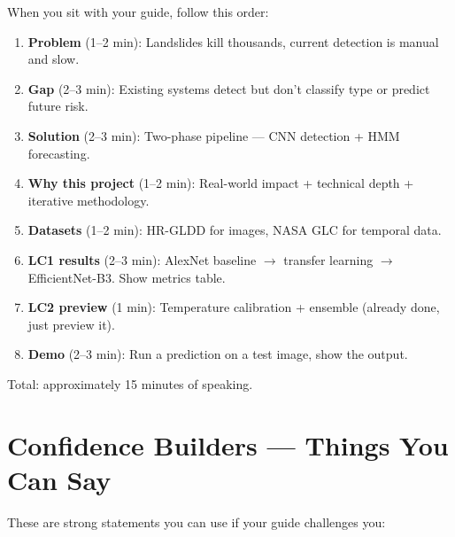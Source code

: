 \documentclass[11pt]{article}
\begin{document}
When you sit with your guide, follow this order:

\begin{enumerate}
    \item \textbf{Problem} (1--2 min): Landslides kill thousands, current detection is manual and slow.
    \item \textbf{Gap} (2--3 min): Existing systems detect but don't classify type or predict future risk.
    \item \textbf{Solution} (2--3 min): Two-phase pipeline --- CNN detection + HMM forecasting.
    \item \textbf{Why this project} (1--2 min): Real-world impact + technical depth + iterative methodology.
    \item \textbf{Datasets} (1--2 min): HR-GLDD for images, NASA GLC for temporal data.
    \item \textbf{LC1 results} (2--3 min): AlexNet baseline $\to$ transfer learning $\to$ EfficientNet-B3. Show metrics table.
    \item \textbf{LC2 preview} (1 min): Temperature calibration + ensemble (already done, just preview it).
    \item \textbf{Demo} (2--3 min): Run a prediction on a test image, show the output.
\end{enumerate}

Total: approximately 15 minutes of speaking.

\section{Confidence Builders --- Things You Can Say}

These are strong statements you can use if your guide challenges you:
\end{document}
